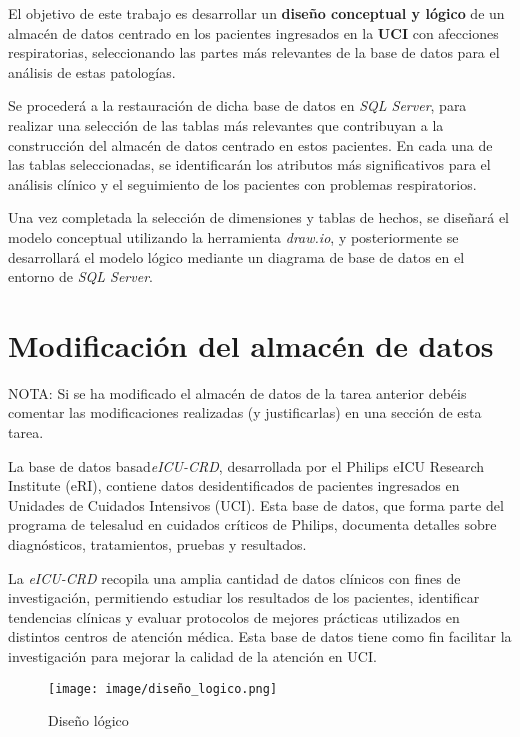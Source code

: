 \documentclass[12pt, a4paper, twoside]{article}
\begin{document}
	El objetivo de este trabajo es desarrollar un \textbf{diseño conceptual y lógico} de un almacén de datos centrado en los pacientes ingresados en la \textbf{UCI} con afecciones respiratorias, seleccionando las partes más relevantes de la base de datos para el análisis de estas patologías.
	
	Se procederá a la restauración de dicha base de datos en \textit{SQL Server}, para realizar una selección de las tablas más relevantes que contribuyan a la construcción del almacén de datos centrado en estos pacientes. En cada una de las tablas seleccionadas, se identificarán los atributos más significativos para el análisis clínico y el seguimiento de los pacientes con problemas respiratorios. 
	
	Una vez completada la selección de dimensiones y tablas de hechos, se diseñará el modelo conceptual utilizando la herramienta \textit{draw.io}, y posteriormente se desarrollará el modelo lógico mediante un diagrama de base de datos en el entorno de \textit{SQL Server}. 
	
	\section{Modificación del almacén de datos}
	
	NOTA: Si se ha modificado el almacén de datos de la tarea anterior debéis comentar las modificaciones realizadas (y justificarlas) en una sección de esta tarea. 
	
	 La base de datos basad\textit{eICU-CRD}, desarrollada por el Philips eICU Research Institute (eRI), contiene datos desidentificados de pacientes ingresados en Unidades de Cuidados Intensivos (UCI). Esta base de datos, que forma parte del programa de telesalud en cuidados críticos de Philips, documenta detalles sobre diagnósticos, tratamientos, pruebas y resultados.
	
	La \textit{eICU-CRD} recopila una amplia cantidad de datos clínicos con fines de investigación, permitiendo estudiar los resultados de los pacientes, identificar tendencias clínicas y evaluar protocolos de mejores prácticas utilizados en distintos centros de atención médica. Esta base de datos tiene como fin facilitar la investigación para mejorar la calidad de la atención en UCI.
	
	\begin{figure}[h!]
		\centering
		\texttt{[image: image/diseño\_logico.png]}
		\caption{Diseño lógico}
		\label{fig:11}
	\end{figure}
	
\end{document}
